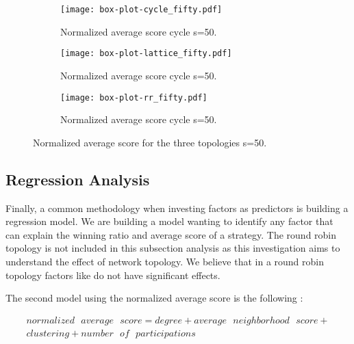 \begin{figure}[!htbp]
\centering
    \begin{subfigure}[t]{1\textwidth}
    \centering
        \texttt{[image: box-plot-cycle\_fifty.pdf]}
    \caption{Normalized average score cycle s=50.}
    \end{subfigure}
\hfill
    \begin{subfigure}[t]{1\textwidth}\centering
    \centering
        \texttt{[image: box-plot-lattice\_fifty.pdf]}
    \caption{Normalized average score cycle s=50.}
    \end{subfigure}
\hfill
    \begin{subfigure}[t]{1\textwidth}\centering
    \centering
        \texttt{[image: box-plot-rr\_fifty.pdf]}
    \caption{Normalized average score cycle s=50.}
    \end{subfigure}
\caption{Normalized average score for the three topologies s=50.}
\label{fig:average-score-fifty}
\end{figure}


\subsection{Regression Analysis}
\label{sub:regression}
Finally, a common methodology when investing factors as predictors is building a
regression model. We are building a model wanting to identify any factor that can
explain the winning ratio and  average score of a strategy. The round robin
topology is not included in this subsection analysis as this investigation aims
to understand the effect of network topology. We believe
that in a round robin topology factors like do not have significant effects.

The second model using the normalized average score is the following :

\begin{equation}\label{regmodel}
\begin{split}
normalized\textrm{ }average\textrm{ }score = degree + average\textrm{ }neighborhood\textrm{ }score + \\
clustering + number\textrm{ }of\textrm{ }participations
\end{split}
\end{equation}

